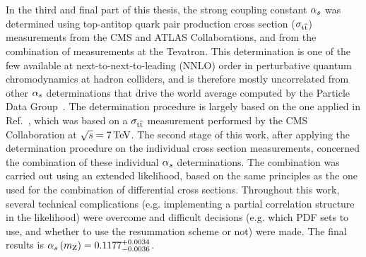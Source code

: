 In the third and final part of this thesis, the strong coupling constant $\alpha_s$ was determined using top-antitop quark pair production cross section ($\sigma_{\mathrm{t}\overline{\mathrm{t}}}$) measurements from the CMS and ATLAS Collaborations, and from the combination of measurements at the Tevatron.
% 
This determination is one of the few available at next-to-next-to-leading (NNLO) order in perturbative quantum chromodynamics at hadron colliders, and is therefore mostly uncorrelated from other $\alpha_s$ determinations that drive the world average computed by the Particle Data Group~\cite{pdg}.
% 
The determination procedure is largely based on the one applied in Ref.~\cite{Chatrchyan:2013haa}, which was based on a $\sigma_{\mathrm{t}\overline{\mathrm{t}}}$ measurement performed by the CMS Collaboration at $\sqrt{s}=7\,\text{TeV}$.
% 
The second stage of this work, after applying the determination procedure on the individual cross section measurements, concerned the combination of these individual $\alpha_s$ determinations.
% 
The combination was carried out using an extended likelihood, based on the same principles as the one used for the combination of differential cross sections.
% 
Throughout this work, several technical complications (e.g. implementing a partial correlation structure in the likelihood) were overcome and difficult decisions (e.g. which PDF sets to use, and whether to use the resummation scheme or not) were made.
% 
The final results is $\alpha_s \left( m_\mathrm{Z} \right)  = 0.1177^{+0.0034}_{-0.0036}$.

